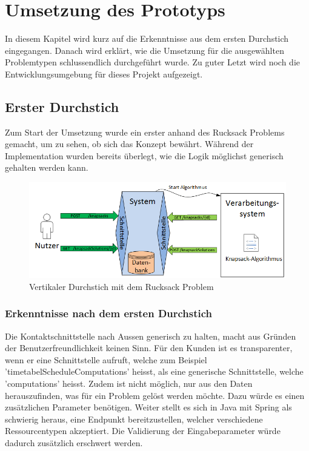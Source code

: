 %
%

\chapter{Umsetzung des Prototyps \resultAssignment{[R5]}}\label{chap.umsetzung}
In diesem Kapitel wird kurz auf die Erkenntnisse aus dem ersten Durchstich eingegangen. Danach wird erklärt, wie die Umsetzung für die ausgewählten Problemtypen schlussendlich 
durchgeführt wurde. Zu guter Letzt wird noch die Entwicklungsumgebung für dieses Projekt aufgezeigt.

\section{Erster Durchstich}\label{entwicklungsumgebung}
Zum Start der Umsetzung wurde ein erster  anhand des Rucksack Problems gemacht, um zu sehen, ob sich das Konzept bewährt. Während der 
Implementation wurden bereits überlegt, wie die Logik möglichst generisch gehalten werden kann.

\begin{figure}[h]
\centering
\includegraphics[scale=0.74]{images/visio/prototype_knapsack.png}
\caption[Vertikaler Durchstich mit dem Rucksack Problem]{Vertikaler Durchstich mit dem Rucksack Problem \selfmade{}}
\label{fig:prototyp_knapsack}
\end{figure}

\subsection{Erkenntnisse nach dem ersten Durchstich}\label{learning_prototyp}
Die Kontaktschnittstelle nach Aussen generisch zu halten, macht aus Gründen der Benutzerfreundlichkeit keinen Sinn. Für den Kunden ist es transparenter, wenn er eine Schnittstelle aufruft, 
welche zum Beispiel 'timetabelScheduleComputations' heisst, als eine generische Schnittstelle, welche 'computations' heisst. Zudem ist nicht möglich, nur aus den Daten herauszufinden, was für 
ein Problem gelöst werden möchte. Dazu würde es einen zusätzlichen Parameter benötigen. Weiter stellt es sich in Java mit Spring als schwierig heraus, eine Endpunkt bereitzustellen, welcher 
verschiedene Ressourcentypen akzeptiert. Die Validierung der Eingabeparameter würde dadurch zusätzlich erschwert werden.

